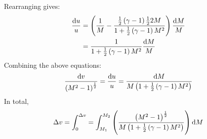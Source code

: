 Rearranging gives:
\begin{align}
    \frac{\dif u}{u} & = \left(\frac{1}{M} - \frac{\frac{1}{2}\left(\gamma -1 \right)\frac{1}{2}2M}{1 + \frac{1}{2}\left(\gamma - 1\right)M^2}\right)\frac{\dif M}{M} \\
                     & = \frac{1}{1 + \frac{1}{2}\left(\gamma - 1\right)M^2}\frac{\dif M}{M}
\end{align}
Combining the above equations:
\begin{equation}
    \frac{\dif v}{\left(M^2 - 1\right)^{\frac{1}{2}}} = \frac{\dif u}{u} = \frac{\dif M}{M\left(1 + \frac{1}{2}\left(\gamma -1\right)M^2\right)}
\end{equation}
In total,
\begin{equation}
    \Delta v = \int_0^{\Delta v} = \int_{M_1}^{M_2} \left(\frac{\left(M^2 - 1\right)^{\frac{1}{2}}}{M \left(1 + \frac{1}{2}\left(\gamma - 1\right)M^2\right)}\right)\dif M
\end{equation}
